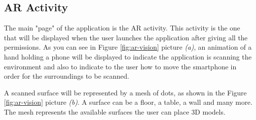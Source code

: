 \subsection{AR Activity}
The main "page" of the application is the AR activity. This activity is the one that will be displayed when the user launches the application after giving all the permissions. As you can see in Figure \ref{fig:ar-vision} picture \textit{(a)}, an animation of a hand holding a phone will be displayed to indicate the application is scanning the environment and also to indicate to the user how to move the smartphone in order for the surroundings to be scanned.

A scanned surface will be represented by a mesh of dots, as shown in the Figure \ref{fig:ar-vision} picture \textit{(b)}. A surface can be a floor, a table, a wall and many more. The mesh represents the available surfaces the user can place \ac{3D} models.
